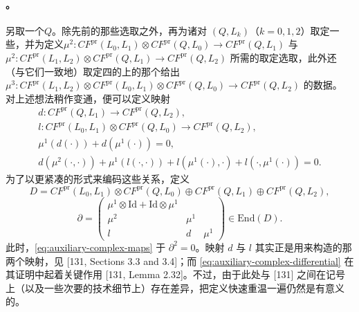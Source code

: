 \paragraph{\trAuxiliaryChainComplex。}\label{sub:auxiliary-chain-complex}
另取一个\trExact\trLagrange\trSubmanifold{}$Q$。除先前的那些选取之外，再为诸对 $(Q,L_k)$（$k=0,1,2$）取定一些\trFloerDatum，并为定义\trTriangleProduct{}$\mu^2\colon CF^{\mathrm{pr}}(L_0,L_1)\otimes CF^{\mathrm{pr}}(Q,L_0)\to CF^{\mathrm{pr}}(Q,L_1)$ 与 $\mu^2\colon CF^{\mathrm{pr}}(L_1,L_2)\otimes CF^{\mathrm{pr}}(Q,L_1)\to CF^{\mathrm{pr}}(Q,L_2)$ 所需的\trPerturbationDatum{}取定选取，此外还（与它们一致地）取定四\trPointedDisc{}的\trUniversal\trFamily{}上的那个给出 $\mu^3\colon CF^{\mathrm{pr}}(L_1,L_2)\otimes CF^{\mathrm{pr}}(L_0,L_1)\otimes CF^{\mathrm{pr}}(Q,L_0)\to CF^{\mathrm{pr}}(Q,L_2)$ 的数据。
对上述想法稍作变通，便可以定义映射
\begin{equation}\label{eq:auxiliary-complex-maps}
\boxed{\begin{aligned}
d\colon CF^{\mathrm{pr}}(Q,L_1)\longrightarrow CF^{\mathrm{pr}}(Q,L_2),\\
l\colon CF^{\mathrm{pr}}(L_0,L_1)\otimes CF^{\mathrm{pr}}(Q,L_0)\longrightarrow CF^{\mathrm{pr}}(Q,L_2),\\
\mu^1(d(\cdot))+d(\mu^1(\cdot))=0,\\
d(\mu^2(\cdot,\cdot))+\mu^1(l(\cdot,\cdot))+l(\mu^1(\cdot),\cdot)+l(\cdot,\mu^1(\cdot))=0.
\end{aligned}}
\end{equation}
为了以更紧凑的形式来编码这些关系，定义
\begin{equation*}
D=CF^{\mathrm{pr}}(L_0,L_1)\otimes CF^{\mathrm{pr}}(Q,L_0)\oplus CF^{\mathrm{pr}}(Q,L_1)\oplus CF^{\mathrm{pr}}(Q,L_2),
\end{equation*}
\begin{equation}\label{eq:auxiliary-complex-differential}
\partial=
\begin{pmatrix}
\mu^1\otimes\mathrm{Id}+\mathrm{Id}\otimes\mu^1 & & \\
\mu^2 & \mu^1 & \\
l & d & \mu^1
\end{pmatrix}
\in\mathrm{End}(D).
\end{equation}
此时，\eqref{eq:auxiliary-complex-maps} \trEquivalence{}于 $\partial^2=0$。映射 $d$ 与 $l$ 其实正是用来构造\trFloerCohomology{}\trLongExactSequence{}的那两个映射，见 [131, Sections 3.3 and 3.4]；而 \eqref{eq:auxiliary-complex-differential} 在其证明中起着关键作用 [131, Lemma 2.32]。不过，由于此处与 [131] 之间在记号上（以及一些次要的技术细节上）存在差异，把定义快速重温一遍仍然是有意义的。
